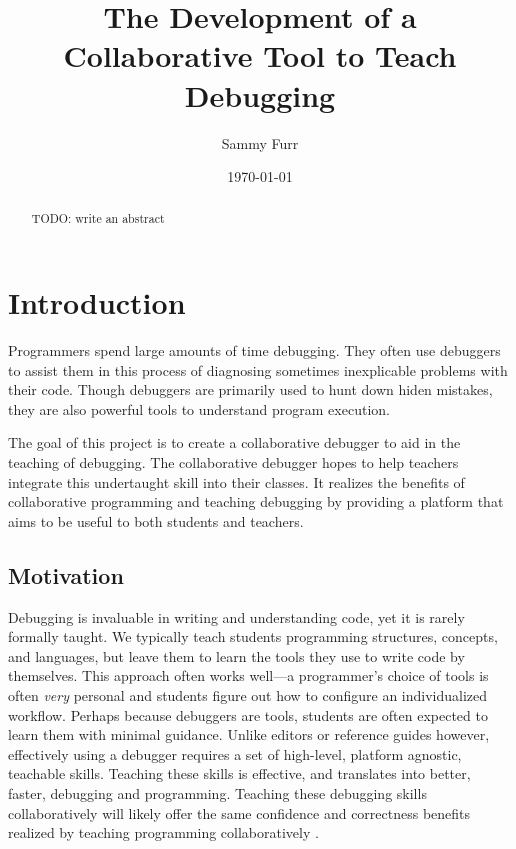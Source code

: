 \documentclass[12pt]{article}
\author{Sammy Furr}
\title{The Development of a Collaborative Tool to Teach Debugging}
\date{\today}
\begin{document}
\begin{titlepage}
  \maketitle
\end{titlepage}

\begin{abstract}
  TODO: write an abstract
\end{abstract}

\tableofcontents
\pagebreak

\section{Introduction}

Programmers spend large amounts of time debugging.  They often use
debuggers to assist them in this process of diagnosing sometimes
inexplicable problems with their code.  Though debuggers are primarily
used to hunt down hiden mistakes, they are also powerful tools to
understand program execution.
\par

The goal of this project is to create a collaborative debugger to aid
in the teaching of debugging.  The collaborative debugger hopes to
help teachers integrate this undertaught skill into their classes.  It
realizes the benefits of collaborative programming and teaching
debugging by providing a platform that aims to be useful to both
students and teachers.

\subsection{Motivation}

Debugging is invaluable in writing and understanding code, yet it is
rarely formally taught\cite{doi:10.1080/08993400802114581}.  We
typically teach students programming structures, concepts, and
languages, but leave them to learn the tools they use to write code by
themselves.  This approach often works well---a programmer's choice of
tools is often \textit{very} personal and students figure out how to
configure an individualized workflow.  Perhaps because debuggers are
tools, students are often expected to learn them with minimal
guidance.  Unlike editors or reference guides however, effectively
using a debugger requires a set of high-level, platform agnostic,
teachable skills.  Teaching these skills is effective, and translates
into better, faster, debugging and
programming\cite{10.1145/3286960.3286970}\cite{10.1145/3361721.3361724}.
Teaching these debugging skills collaboratively will likely offer the
same confidence and correctness benefits realized by teaching
programming collaboratively
\cite{10.1145/1026487.1008043}\cite{10.1145/1145287.1145293}.
\end{document}
